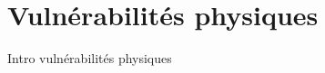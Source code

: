 

\chapter{Vulnérabilités physiques}\label{vulnerabilites:physiques}

Intro vulnérabilités physiques



\endinput
